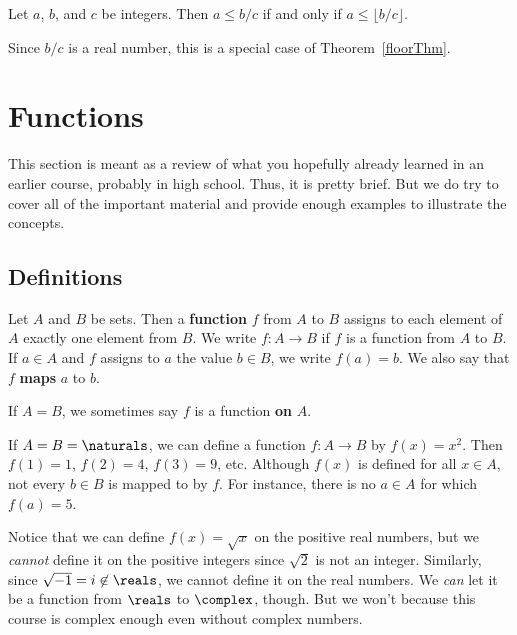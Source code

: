 \begin{cor}\label{floorCor}
Let $a$, $b$, and $c$ be integers.  Then $a\leq b/c$ if and only if $a\leq \lfloor b/c\rfloor$.
\begin{pf}
Since $b/c$ is a real number, this is a special case of Theorem~\ref{floorThm}.
\end{pf}
\end{cor}





%

\newpage
\section{Functions}\label{section:functions}
This section is meant as a review of what you hopefully already learned in an earlier course, probably in high school.
Thus, it is pretty brief.  But we do try to cover all of the important material and provide enough examples to
illustrate the concepts.

\subsection{Definitions}\label{section:functionDefs}

\begin{df}
Let $A$ and $B$ be sets.  Then a {\bf function} $f$ from $A$ to $B$ assigns to each element of $A$
exactly one element from $B$. We write $f: A\to B$ if $f$ is a function from $A$ to $B$.
If $a\in A$ and $f$ assigns to $a$ the value $b\in B$, we write 
$f(a)=b$.  We also say that $f$ {\bf maps} $a$ to $b$.

If $A=B$, we sometimes say $f$ is a function {\bf on} $A$.
\end{df}

\begin{exa}
If $A= B=\naturals$, we can define a function $f: A\to B$ by $f(x)=x^2$.
Then $f(1)=1$, $f(2)=4$, $f(3)=9$, etc.
Although $f(x)$ is defined for all $x\in A$, not every $b\in B$ is mapped to by $f$.
For instance, there is no $a\in A$ for which $f(a)=5$.
\end{exa}

\begin{exa}
Notice that we can define $f(x)=\sqrt{x}$ on the positive real numbers, but we {\em cannot}
define it on the positive integers since $\sqrt{2}$ is not an integer.
Similarly, since $\sqrt{-1}=i\not\in\reals$, we cannot define it on the real numbers.  
We {\em can} let it be a function from $\reals$ to $\complex$, though.
But we won't because this course is complex enough even without complex numbers.
\end{exa}


